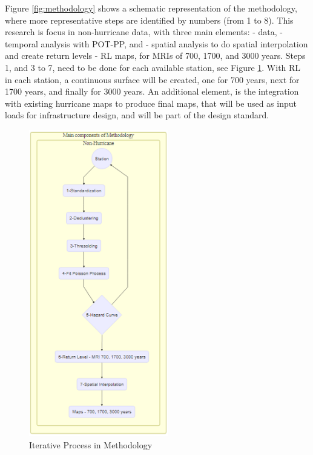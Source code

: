 \documentclass[12pt,oneside]{reedthesis}
\begin{document}
Figure \ref{fig:methodology} shows a schematic representation of the methodology, where more representative steps are identified by numbers (from 1 to 8). This research is focus in non-hurricane data, with three main elements: - data, - temporal analysis with POT-PP, and - spatial analysis to do spatial interpolation and create return levels - RL maps, for MRIs of 700, 1700, and 3000 years. Steps 1, and 3 to 7, need to be done for each available station, see Figure \ref{fig:mainmethodology}. With RL in each station, a continuous surface will be created, one for 700 years, next for 1700 years, and finally for 3000 years. An additional element, is the integration with existing hurricane maps to produce final maps, that will be used as input loads for infrastructure design, and will be part of the design standard.
\begin{figure}

{\centering \includegraphics[width=2.4in]{figure/main_methodology} 

}

\caption{Iterative Process in Methodology}\label{fig:mainmethodology}
\end{figure}
\end{document}
